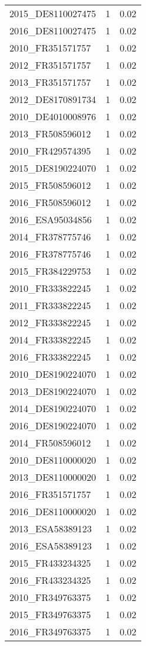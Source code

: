 \begin{table*}[htbp]
\begin{tabular}{lrr}
2015_DE8110027475 & 1 & 0.02 \\
2016_DE8110027475 & 1 & 0.02 \\
2010_FR351571757 & 1 & 0.02 \\
2012_FR351571757 & 1 & 0.02 \\
2013_FR351571757 & 1 & 0.02 \\
2012_DE8170891734 & 1 & 0.02 \\
2010_DE4010008976 & 1 & 0.02 \\
2013_FR508596012 & 1 & 0.02 \\
2010_FR429574395 & 1 & 0.02 \\
2015_DE8190224070 & 1 & 0.02 \\
2015_FR508596012 & 1 & 0.02 \\
2016_FR508596012 & 1 & 0.02 \\
2016_ESA95034856 & 1 & 0.02 \\
2014_FR378775746 & 1 & 0.02 \\
2016_FR378775746 & 1 & 0.02 \\
2015_FR384229753 & 1 & 0.02 \\
2010_FR333822245 & 1 & 0.02 \\
2011_FR333822245 & 1 & 0.02 \\
2012_FR333822245 & 1 & 0.02 \\
2014_FR333822245 & 1 & 0.02 \\
2016_FR333822245 & 1 & 0.02 \\
2010_DE8190224070 & 1 & 0.02 \\
2013_DE8190224070 & 1 & 0.02 \\
2014_DE8190224070 & 1 & 0.02 \\
2016_DE8190224070 & 1 & 0.02 \\
2014_FR508596012 & 1 & 0.02 \\
2010_DE8110000020 & 1 & 0.02 \\
2013_DE8110000020 & 1 & 0.02 \\
2016_FR351571757 & 1 & 0.02 \\
2016_DE8110000020 & 1 & 0.02 \\
2013_ESA58389123 & 1 & 0.02 \\
2016_ESA58389123 & 1 & 0.02 \\
2015_FR433234325 & 1 & 0.02 \\
2016_FR433234325 & 1 & 0.02 \\
2010_FR349763375 & 1 & 0.02 \\
2015_FR349763375 & 1 & 0.02 \\
2016_FR349763375 & 1 & 0.02 \\

\end{tabular}
\end{table*}
